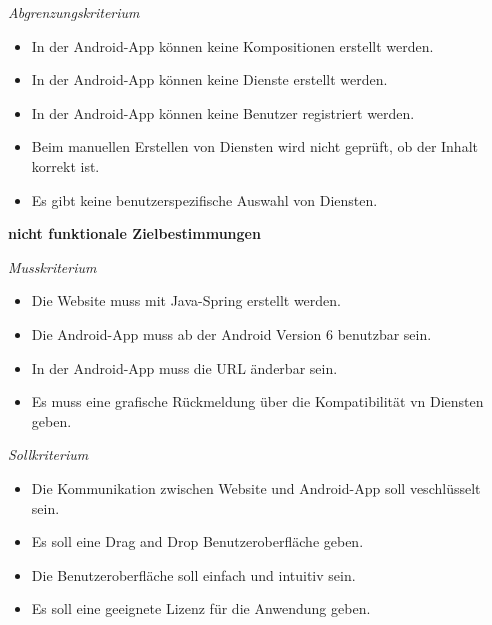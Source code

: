 \textit{Abgrenzungskriterium}

\begin{itemize}[leftmargin=4pc]
	\item In der Android-App können keine Kompositionen erstellt werden.
	\item In der Android-App können keine Dienste erstellt werden.
	\item In der Android-App können keine Benutzer registriert werden.
	\item Beim manuellen Erstellen von Diensten wird nicht geprüft, ob der Inhalt korrekt ist.
	\item Es gibt keine benutzerspezifische Auswahl von Diensten.\\
\end{itemize}


\textbf{nicht funktionale Zielbestimmungen}\newline

\textit{Musskriterium}

\begin{itemize}[leftmargin=4pc]
	\item Die Website muss mit Java-Spring erstellt werden.
	\item Die Android-App muss ab der Android Version 6 benutzbar sein.
	\item In der Android-App muss die URL änderbar sein.
	\item Es muss eine grafische Rückmeldung über die Kompatibilität vn Diensten geben.
\end{itemize}

\textit{Sollkriterium}

\begin{itemize}[leftmargin=4pc]
	\item Die Kommunikation zwischen Website und Android-App soll veschlüsselt sein.
	\item Es soll eine Drag and Drop Benutzeroberfläche geben.
	\item Die Benutzeroberfläche soll einfach und intuitiv sein.
	\item Es soll eine geeignete Lizenz für die Anwendung geben.
\end{itemize}